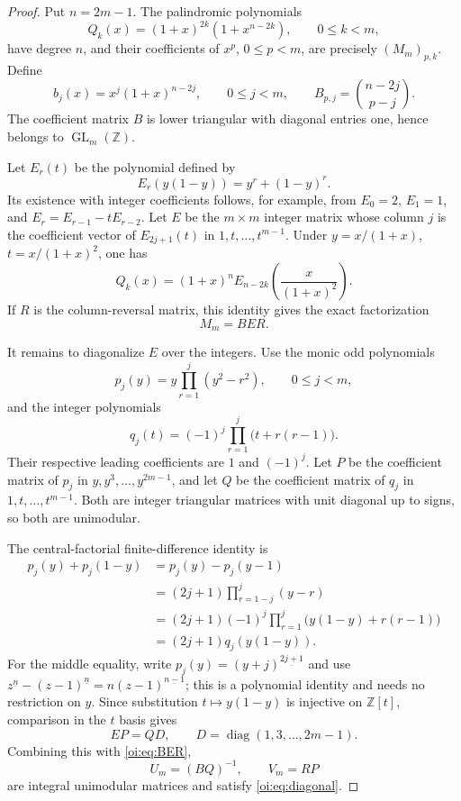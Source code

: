 \documentclass[11pt,letterpaper]{article}
\theoremstyle{definition}
\theoremstyle{remark}
\begin{document}
\begin{proof}
Put $n=2m-1$.  The palindromic polynomials
\[
 Q_k(x)=(1+x)^{2k}(1+x^{n-2k}),\qquad 0\leq k<m,
\]
have degree $n$, and their coefficients of $x^p$, $0\leq p<m$, are
precisely $(M_m)_{p,k}$.  Define
\[
 b_j(x)=x^j(1+x)^{n-2j},\qquad 0\leq j<m,
 \qquad
 B_{p,j}=\binom{n-2j}{p-j}.
\]
The coefficient matrix $B$ is lower triangular with diagonal entries
one, hence belongs to $\operatorname{GL}_m(\mathbb Z)$.

Let $E_r(t)$ be the polynomial defined by
\[
 E_r(y(1-y))=y^r+(1-y)^r.
\]
Its existence with integer coefficients follows, for example, from
$E_0=2$, $E_1=1$, and $E_r=E_{r-1}-tE_{r-2}$.
Let $E$ be the $m\times m$ integer matrix whose column $j$ is the
coefficient vector of $E_{2j+1}(t)$ in $1,t,\ldots,t^{m-1}$.
Under $y=x/(1+x)$, $t=x/(1+x)^2$, one has
\[
 Q_k(x)=(1+x)^n E_{n-2k}\!\left(\frac{x}{(1+x)^2}\right).
\]
If $R$ is the column-reversal matrix, this identity gives the exact
factorization
\begin{equation}\label{oi:eq:BER}
 M_m=BER.
\end{equation}

It remains to diagonalize $E$ over the integers.  Use the monic odd
polynomials
\[
 p_j(y)=y\prod_{r=1}^j(y^2-r^2),\qquad 0\leq j<m,
\]
and the integer polynomials
\[
 q_j(t)=(-1)^j\prod_{r=1}^j\bigl(t+r(r-1)\bigr).
\]
Their respective leading coefficients are $1$ and $(-1)^j$.
Let $P$ be the coefficient matrix of $p_j$ in
$y,y^3,\ldots,y^{2m-1}$, and let $Q$ be the coefficient matrix of
$q_j$ in $1,t,\ldots,t^{m-1}$.  Both are integer triangular matrices
with unit diagonal up to signs, so both are unimodular.

The central-factorial finite-difference identity is
\begin{align*}
 p_j(y)+p_j(1-y)
 &=p_j(y)-p_j(y-1)\\
 &=(2j+1)\prod_{r=1-j}^{j}(y-r)\\
 &=(2j+1)(-1)^j
       \prod_{r=1}^j\bigl(y(1-y)+r(r-1)\bigr)\\
 &=(2j+1)q_j(y(1-y)).
\end{align*}
For the middle equality, write
$p_j(y)=(y+j)^{\underline{2j+1}}$ and use
$z^{\underline n}-(z-1)^{\underline n}
=n(z-1)^{\underline{n-1}}$; this is a polynomial identity and needs no
restriction on $y$.  Since substitution $t\mapsto y(1-y)$ is injective
on $\mathbb Z[t]$, comparison in the $t$ basis gives
\[
 EP=QD,\qquad D=\operatorname{diag}(1,3,\ldots,2m-1).
\]
Combining this with \eqref{oi:eq:BER},
\[
 U_m=(BQ)^{-1},\qquad V_m=RP
\]
are integral unimodular matrices and satisfy \eqref{oi:eq:diagonal}.


\end{proof}
\end{document}
